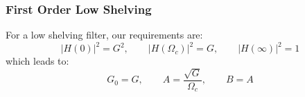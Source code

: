 \subsubsection{First Order Low Shelving}
For a low shelving filter, our requirements are:
\begin{equation}
 |H(0)|^2 = G^2, \qquad |H(\Omega_c)|^2 = G, \qquad |H(\infty)|^2 = 1
\end{equation}
which leads to:
\begin{equation}
 G_0 = G, \qquad A = \frac{\sqrt{G}}{\Omega_c}, \qquad B = A
\end{equation}




















